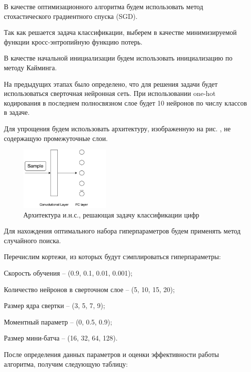\begin{textitemize}
\item В качестве оптимизационного алгоритма будем использовать метод стохастического градиентного спуска (SGD).


\item Так как решается задача классификации, выберем в качестве минимизируемой функции кросс-энтропийную функцию потерь.


\item В качестве начальной инициализации будем использовать инициализацию по методу Кайминга.


\item На предыдущих этапах было определено, что для решения задачи будет использоваться сверточная нейронная сеть. При использовании one-hot кодирования в последнем полносвязном слое будет 10 нейронов по числу классов в задаче.

Для упрощения будем использовать архитектуру, изображенную на рис. , не содержащую промежуточные слои.

\begin{figure}[h]
	\centering
	\includegraphics[width=0.4\textwidth]{author/part3/figures/model.png}
	\caption{Архитектура и.н.с., решающая задачу классификации цифр}
	\label{fig:model}
\end{figure}

Для нахождения оптимального набора гиперпараметров будем применять метод случайного поиска.

Перечислим кортежи, из которых будут сэмплироваться гиперпараметры:
\begin{textitemize}
	\item Скорость обучения -- (0.9, 0.1, 0.01, 0.001);
	\item Количество нейронов в сверточном слое -- (5, 10, 15, 20);
	\item Размер ядра свертки -- (3, 5, 7, 9);
	\item Моментный параметр -- (0, 0.5, 0.9);
	\item Размер мини-батча -- (16, 32, 64, 128).
\end{textitemize}

После определения данных параметров и оценки эффективности работы алгоритма, получим следующую таблицу:


\end{textitemize}

